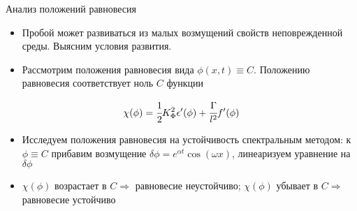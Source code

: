 \documentclass{beamer}
\begin{document}
\begin{frame}{Анализ положений равновесия}
\begin{itemize}
	\item Пробой может развиваться из малых возмущений свойств неповрежденной среды. Выясним
	условия развития.
	\item Рассмотрим положения равновесия вида $\phi(x, t) \equiv C$. Положению равновесия
	соответствует ноль $C$ функции
\end{itemize}
$$\chi(\phi) = \cfrac{1}{2} K_\Phi^2 \epsilon'(\phi) + \cfrac{\Gamma}{l^2} f'(\phi)$$
\vspace{-0.5cm}
\begin{itemize}
	\item Исследуем положения равновесия на устойчивость спектральным методом: к $\phi \equiv C$
	прибавим возмущение $\delta \phi = e^{\alpha t}\cos(\omega x)$, линеаризуем уравнение на
	$\delta \phi$
	\item $\chi(\phi)$ возрастает в $C \Longrightarrow$ равновесие неустойчиво; $\chi(\phi)$
	убывает в $C \Longrightarrow$ равновесие устойчиво
\end{itemize}
\end{frame}
\end{document}
